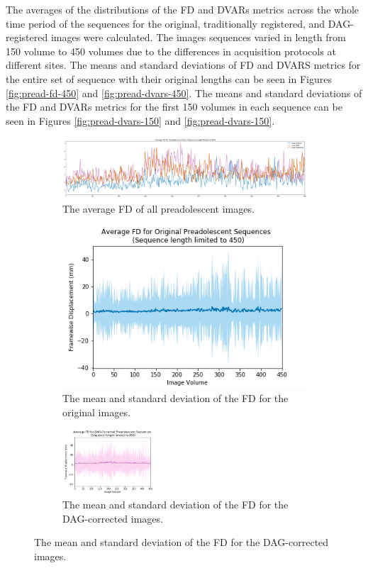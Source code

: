 The averages of the distributions of the FD and DVARs metrics across the whole time period of the sequences for the original, traditionally registered, and DAG-registered images were calculated. The images sequences varied in length from 150 volume to 450 volumes due to the differences in acquisition protocols at different sites. The means and standard deviations of FD and DVARS metrics for the entire set of sequence with their original lengths can be seen in Figures \ref{fig:pread-fd-450} and \ref{fig:pread-dvars-450}. The means and standard deviations of the FD and DVARs metrics for the first 150 volumes in each sequence can be seen in Figures \ref{fig:pread-dvars-150} and \ref{fig:pread-dvars-150}. 

\begin{figure}[t]
	\centering
	\begin{subfigure}{0.9\textwidth}
		\centering
		\includegraphics[width=1.0\textwidth]{6/figures/pread_fd_all_450_avg.png}
		\caption{The average FD of all preadolescent images.}
	\end{subfigure}

	\begin{subfigure}{0.9\textwidth}
		\centering
		\includegraphics[width=.4\textwidth]{6/figures/pread-bold-fd-450.png}
		\caption{The mean and standard deviation of the FD for the original images.}
	\end{subfigure}
	
	\begin{subfigure}{0.9\textwidth}
		\centering
		\includegraphics[width=0.4\textwidth]{6/figures/pread-dag-fd-450.png}
		\caption{The mean and standard deviation of the FD for the DAG-corrected images.}
	\end{subfigure}
	

\end{figure}
